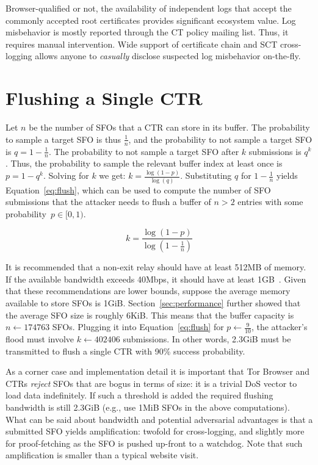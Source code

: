 Browser-qualified or not, the availability of independent logs that accept the
commonly accepted root certificates provides significant ecosystem value.
Log misbehavior is mostly reported through the CT policy mailing list.  Thus, it
requires manual intervention.  Wide support of certificate chain and SCT
cross-logging allows anyone to \emph{casually} disclose suspected log
misbehavior on-the-fly.

\section{Flushing a Single CTR} \label{app:flush}
Let $n$ be the number of SFOs that a CTR can store in its buffer.  The
probability to sample a target SFO is thus $\frac{1}{n}$, and the probability to
not sample a target SFO is $q = 1 - \frac{1}{n}$.  The probability to not sample
a target SFO after $k$ submissions is $q^k$.  Thus, the probability to sample
the relevant buffer index at least once is $p = 1 - q^k$.  Solving for $k$ we
get: $k = \frac{\log(1 - p)}{\log(q)}$.  Substituting $q$ for $1 - \frac{1}{n}$
yields Equation~\ref{eq:flush}, which can be used to compute the number of
SFO submissions that the attacker needs to flush a buffer of $n>2$
entries with some probability~$p\in[0,1)$.

\begin{equation} \label{eq:flush}
	k = \frac{\log(1-p)}{\log(1 - \frac{1}{n})}
\end{equation}

It is recommended that a non-exit relay should have at least 512MB of memory.
If the available bandwidth exceeds 40Mbps, it should have at least
1GB~\cite{relay-config}.  Given that these recommendations are lower bounds,
suppose the average memory available to store SFOs is 1GiB.
Section~\ref{sec:performance} further showed that the average SFO size is
roughly 6KiB.  This means that the buffer capacity is $n \gets 174763$ SFOs.
Plugging it into Equation~\ref{eq:flush} for $p \gets \frac{9}{10}$, the
attacker's flood must involve $k \gets 402406$ submissions.  In other words,
2.3GiB must be transmitted to flush a single CTR with 90\% success probability.

As a corner case and implementation detail it is important that Tor Browser and
CTRs \emph{reject} SFOs that are bogus in terms of size: it is a trivial DoS
vector to load data indefinitely.  If such a threshold is added the required
flushing bandwidth is still 2.3GiB (e.g., use 1MiB SFOs in the above
computations).  What can be said about bandwidth and potential adversarial
advantages is that a submitted SFO yields amplification:
	twofold for cross-logging, and
	slightly more for proof-fetching as the SFO is pushed up-front to a
		watchdog.
Note that such amplification is smaller than a typical website visit.
